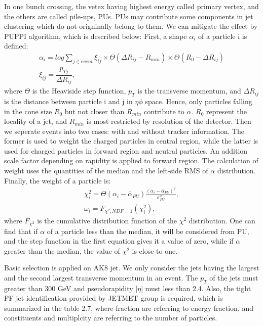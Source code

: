 In one bunch crossing, the vetex having highest energy called primary vertex, and the others are called pile-ups, PUs. PUs may contribute some components in jet clustering which do not origninally belong to them. We can mitigate the effect by PUPPI algorithm, which is described below:
First, a shape $\alpha _{i}$ of a particle i is defined: 
\begin{equation} \label{eq2}
\begin{split}
\alpha_i = log \sum\limits_{j\in event} \xi _{ij} \times \Theta(\Delta R_{ij} - R_{min}) \times \Theta(R_0 - \Delta R_{ij}) \\
\xi _{ij} = \dfrac{p_{Tj}}{\Delta R_{ij}}, 
\end{split}
\end{equation}
where $\Theta$ is the Heaviside step function, $p_{T}$ is the transverse momentum, and $\Delta R_{ij}$ is the distance between particle i and j in $\eta \phi$ space. Hence, only particles falling in the cone size $R_0$ but not closer than $R_{min}$ contribute to $\alpha $. $R_0$ represent the locality of a jet, and $R_{min}$ is most restricted by resolution of the detector. Then we seperate events into two cases: with and without tracker information. The former is used to weight the charged particles in central region, while the latter is used for charged particles in forward region and neutral particles. An addition scale factor depending on rapidity is applied to forward region. The calculation of weight uses the quantities of the median and the left-side RMS of $\alpha $ distribution. Finally, the weight of a particle is: 
\begin{equation} \label{eq3}
\begin{split}
\chi ^2_{i} = \Theta(\alpha _i - \bar{\alpha } _{PU}) \frac{ ( \alpha _i - \bar{\alpha } _{PU})^2 }{\sigma ^2 _{PU}} , \\
\omega _i = F_{\chi ^2,NDF=1}(\chi ^2_i), 
\end{split}
\end{equation}
where $F_{\chi ^2}$ is the cumulative distribution function of the $\chi ^2$ distribution. One can find that if $\alpha $ of a particle less than the median, it will be considered from PU, and the step function in the first equation gives it a value of zero, while if $\alpha $ greater than the median, the value of $\chi  ^2$ is close to one. 

Basic selection is applied on AK8 jet. We only consider the jets having the largest and the second largest transverse momentum in an event. The $p_{T}$ of the jets must greater than 300 GeV and pseudorapidity |$\eta$| must less than 2.4. Also, the tight PF jet identification provided by JETMET group is required, which is summarized in the table 2.7, where fraction are referring to energy fraction, and constituents and multiplcity are referring to the number of particles.

